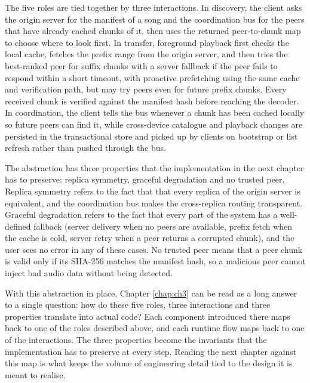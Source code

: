 \par The five roles are tied together by three interactions. In discovery, the client asks the origin server for the manifest of a song and the coordination bus for the peers that have already cached chunks of it, then uses the returned peer-to-chunk map to choose where to look first. In transfer, foreground playback first checks the local cache, fetches the prefix range from the origin server, and then tries the best-ranked peer for suffix chunks with a server fallback if the peer fails to respond within a short timeout, with proactive prefetching using the same cache and verification path, but may try peers even for future prefix chunks. Every received chunk is verified against the manifest hash before reaching the decoder. In coordination, the client tells the bus whenever a chunk has been cached locally so future peers can find it, while cross-device catalogue and playback changes are persisted in the transactional store and picked up by clients on bootstrap or list refresh rather than pushed through the bus.

\par The abstraction has three properties that the implementation in the next chapter has to preserve: replica symmetry, graceful degradation and no trusted peer. Replica symmetry refers to the fact that that every replica of the origin server is equivalent, and the coordination bus makes the cross-replica routing transparent. Graceful degradation refers to the fact that every part of the system has a well-defined fallback (server delivery when no peers are available, prefix fetch when the cache is cold, server retry when a peer returns a corrupted chunk), and the user sees no error in any of these cases. No trusted peer means that a peer chunk is valid only if its SHA-256 matches the manifest hash, so a malicious peer cannot inject bad audio data without being detected.

\indent \par With this abstraction in place, Chapter \ref{chap:ch3} can be read as a long answer to a single question: how do these five roles, three interactions and three properties translate into actual code? Each component introduced there maps back to one of the roles described above, and each runtime flow maps back to one of the interactions. The three properties become the invariants that the implementation has to preserve at every step. Reading the next chapter against this map is what keeps the volume of engineering detail tied to the design it is meant to realise.
